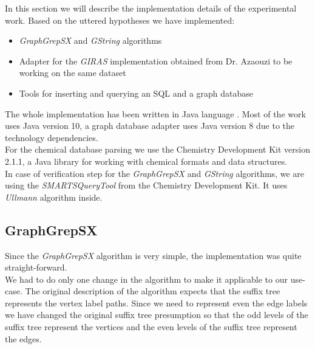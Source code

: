 In this section we will describe the implementation details of the experimental work. Based on the uttered hypotheses we have implemented:

\begin{itemize}
	\item \textit{GraphGrepSX} and \textit{GString} algorithms
	
	\item Adapter for the \textit{GIRAS} implementation obtained from Dr. Azaouzi to be working on the same dataset
	
	\item Tools for inserting and querying an SQL and a graph database
\end{itemize}

The whole implementation has been written in Java language \cite{java}. Most of the work uses Java version 10, a graph database adapter uses Java version 8 due to the technology dependencies.\\

For the chemical database parsing we use the Chemistry Development Kit \cite{CDK} version 2.1.1, a Java library for working with chemical formats and data structures.\\

In case of verification step for the \textit{GraphGrepSX} and \textit{GString} algorithms, we are using the \textit{SMARTSQueryTool} from the Chemistry Development Kit. It uses \textit{Ullmann} \cite{Ullmann} algorithm inside.

\subsection{GraphGrepSX} \label{graphgrep-implementation}

Since the \textit{GraphGrepSX} algorithm is very simple, the implementation was quite straight-forward.\\

We had to do only one change in the algorithm to make it applicable to our use-case. The original description of the algorithm expects that the suffix tree represents the vertex label paths. Since we need to represent even the edge labels we have changed the original suffix tree presumption so that the odd levels of the suffix tree represent the vertices and the even levels of the suffix tree represent the edges.\\

